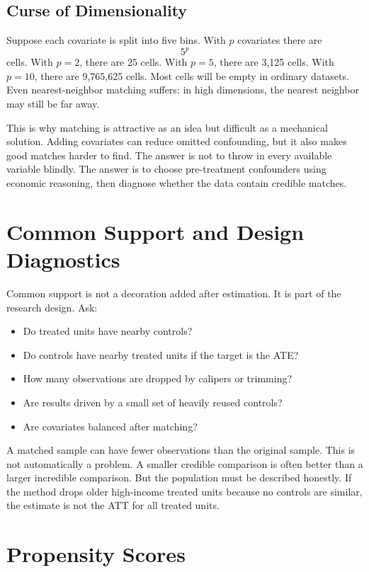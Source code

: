 \subsection{Curse of Dimensionality}

Suppose each covariate is split into five bins. With \(p\) covariates there are
\[
    5^p
\]
cells. With \(p=2\), there are 25 cells. With \(p=5\), there are 3,125 cells.
With \(p=10\), there are 9,765,625 cells. Most cells will be empty in ordinary
datasets. Even nearest-neighbor matching suffers: in high dimensions, the
nearest neighbor may still be far away.

This is why matching is attractive as an idea but difficult as a mechanical
solution. Adding covariates can reduce omitted confounding, but it also makes
good matches harder to find. The answer is not to throw in every available
variable blindly. The answer is to choose pre-treatment confounders using
economic reasoning, then diagnose whether the data contain credible matches.

\section{Common Support and Design Diagnostics}

Common support is not a decoration added after estimation. It is part of the
research design. Ask:
\begin{itemize}
    \item Do treated units have nearby controls?
    \item Do controls have nearby treated units if the target is the ATE?
    \item How many observations are dropped by calipers or trimming?
    \item Are results driven by a small set of heavily reused controls?
    \item Are covariates balanced after matching?
\end{itemize}

A matched sample can have fewer observations than the original sample. This is
not automatically a problem. A smaller credible comparison is often better than
a larger incredible comparison. But the population must be described honestly.
If the method drops older high-income treated units because no controls are
similar, the estimate is not the ATT for all treated units.

\section{Propensity Scores}

